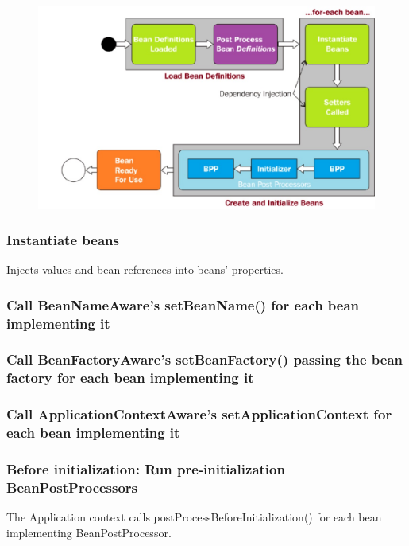 \documentclass{scrartcl}
\begin{document}
\begin{figure}
    \centering
    \includegraphics[width=1\linewidth]{bean-lifecycle-3}
    \caption{}
    \label{fig:bean-lifecycle-1}
\end{figure}

\subsubsection{Instantiate beans}
Injects values and bean references into beans’ properties.

\subsubsection{Call BeanNameAware’s setBeanName() for each bean implementing it}

\subsubsection{Call BeanFactoryAware’s setBeanFactory() passing the bean factory for each bean implementing it}

\subsubsection{Call ApplicationContextAware’s setApplicationContext for each bean implementing it}

\subsubsection{Before initialization: Run pre-initialization BeanPostProcessors}
The Application context calls postProcessBeforeInitialization() for each bean implementing BeanPostProcessor.
\end{document}
